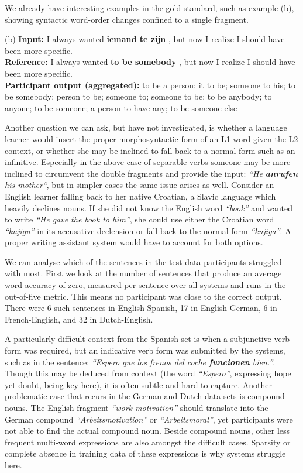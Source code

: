 We already have interesting examples in the gold standard, such as example (b),
showing syntactic word-order changes confined to a single fragment.

\begin{examples}
\footnotesize
\item[(b)] \textbf{Input:} I always wanted \textbf{iemand te zijn} , but now I realize I should have been more specific.\\
\textbf{Reference:} I always wanted \textbf{to be somebody} , but now I realize I should have been more specific.\\
\textbf{Participant output (aggregated):} to be a person; it to be; someone to his; to be somebody; person to be; someone to; someone to be; to be anybody; to anyone; to be someone; a person to have any; to be someone else
\end{examples}

Another question we can ask, but have not investigated, is whether a language
learner would insert the proper morphosyntactic form of an L1 word given the L2
context, or whether she may be inclined to fall back to a normal form such as
an infinitive. Especially in the above case of separable verbs someone may be
more inclined to circumvent the double fragments and provide the input:
\emph{``He \textbf{anrufen} his mother``}, but in simpler cases the same issue
arises as well. Consider an English learner falling back to her native
Croatian, a Slavic language which heavily declines nouns. If she did not know
the English word \emph{``book''} and wanted to write \emph{``He gave the book
to him''}, she could use either the Croatian word \emph{``knjigu''} in its
accusative declension or fall back to the normal form \emph{``knjiga''}. A
proper writing assistant system would have to account for both options. 

We can analyse which of the sentences in the test data participants struggled
with most. First we look at the number of sentences that produce an average
word accuracy of zero, measured per sentence over all systems and runs in the
out-of-five metric. This means no participant was close to the correct output.
There were 6 such sentences in English-Spanish, 17 in English-German, 6 in
French-English, and 32 in Dutch-English. 

A particularly difficult context from the Spanish set is when a subjunctive
verb form was required, but an indicative verb form was submitted by the
systems, such as in the sentence: \emph{``Espero que los frenos del coche
\textbf{funcionen} bien.''}. Though this may be deduced from context (the word
\emph{``Espero''}, expressing hope yet doubt, being key here), it is often
subtle and hard to capture. Another problematic case that recurs in the German
and Dutch data sets is compound nouns. The English fragment \emph{``work
motivation''} should translate into the German compound
\emph{``Arbeitsmotivation''} or \emph{``Arbeitsmoral''}, yet participants were
not able to find the actual compound noun. Beside compound nouns, other less
frequent multi-word expressions are also amongst the difficult cases. Sparsity
or complete absence in training data of these expressions is why systems
struggle here.


